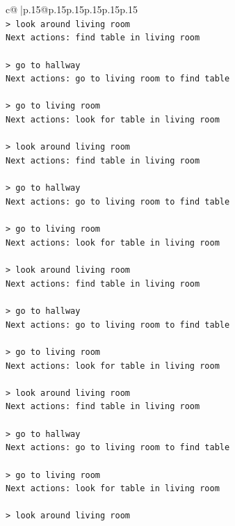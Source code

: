 \documentclass{article}
\begin{document}
{\begin{supertabular}{c@{$\;$}|p{.15\linewidth}@{}p{.15\linewidth}p{.15\linewidth}p{.15\linewidth}p{.15\linewidth}p{.15\linewidth}}
{{{\\ 
\texttt{> look around living room} \\
\texttt{Next actions: find table in living room} \\
\\ 
\texttt{> go to hallway} \\
\texttt{Next actions: go to living room to find table} \\
\\ 
\texttt{> go to living room} \\
\texttt{Next actions: look for table in living room} \\
\\ 
\texttt{> look around living room} \\
\texttt{Next actions: find table in living room} \\
\\ 
\texttt{> go to hallway} \\
\texttt{Next actions: go to living room to find table} \\
\\ 
\texttt{> go to living room} \\
\texttt{Next actions: look for table in living room} \\
\\ 
\texttt{> look around living room} \\
\texttt{Next actions: find table in living room} \\
\\ 
\texttt{> go to hallway} \\
\texttt{Next actions: go to living room to find table} \\
\\ 
\texttt{> go to living room} \\
\texttt{Next actions: look for table in living room} \\
\\ 
\texttt{> look around living room} \\
\texttt{Next actions: find table in living room} \\
\\ 
\texttt{> go to hallway} \\
\texttt{Next actions: go to living room to find table} \\
\\ 
\texttt{> go to living room} \\
\texttt{Next actions: look for table in living room} \\
\\ 
\texttt{> look around living room} \\
}}}
\end{supertabular}}
\end{document}
